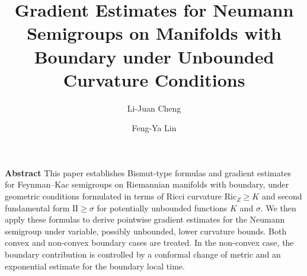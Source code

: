 \documentclass[11pt,twoside, reqno]{article}
\newcommand\1{\mathbbm{1}}
\theoremstyle{definition}
\numberwithin{equation}{section}
\begin{document}

 \arraycolsep=1pt


\title{\bf\Large
Gradient Estimates for Neumann Semigroups on Manifolds with Boundary  under  Unbounded  Curvature Conditions
}

 

\author[1]{Li-Juan Cheng}    \author[2]{Feng-Ya Lin}   


 
  



\date{}
\maketitle

\vspace{-0.8cm}

\begin{center}
\begin{minipage}{13.5cm}
{\small {\bf Abstract} \quad
This paper establishes Bismut-type formulas and gradient estimates for Feynman--Kac semigroups on Riemannian manifolds with boundary, under geometric conditions
formulated in terms of  Ricci curvature $\mathrm{Ric}_Z \geq K$ and second fundamental form $\mathrm{II} \geq \sigma$ for potentially unbounded functions $K$ and $\sigma$.  We then apply these formulas to derive pointwise gradient estimates for the
Neumann semigroup under variable, possibly unbounded, lower curvature bounds.
Both convex and non-convex boundary cases are treated. In the non-convex case,
the boundary contribution is controlled by a conformal change of metric and
an exponential estimate for the boundary local time.}
\end{minipage}
\end{center}
\end{document}
